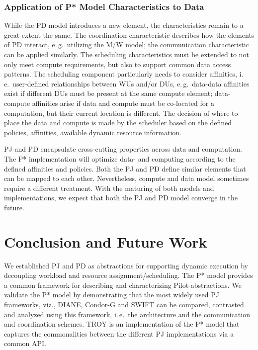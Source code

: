 \documentclass[conference,final]{IEEEtran}
\newcommand{\upp}{\vspace*{-0.5em}}
\begin{document}
\subsubsection*{Application of P* Model Characteristics to Data}

While the PD model introduces a new element, the characteristics remain
to a great extent the same. The coordination characteristic describes
how the elements of PD interact, e.\,g.\ utilizing the M/W model; the 
communication characteristic can be applied similarly. The scheduling 
characteristics must be extended to not only meet compute requirements, but also 
to support common data access patterns. The scheduling 
component particularly needs to consider affinities, i.\,e.\ user-defined 
relationships between WUs and/or DUs, e.\,g.\ data-data affinities exist if
different DUs must be present at the same compute element; data-compute
affinities arise if data and compute must be co-located for a
computation, but their current location is different. The decision of
where to place the data and compute is made by the scheduler based on
the defined policies, affinities, available dynamic resource
information.

PJ and PD encapsulate cross-cutting properties across data and
computation. The P* implementation will optimize data- and computing
according to the defined affinities and policies. Both the PJ and PD
define similar elements that can be mapped to each
other. Nevertheless, compute and data model sometimes require a
different treatment. With the maturing of both models and
implementations, we expect that both the PJ and PD model converge in
the future. 

%


\section{Conclusion and Future Work\upp\upp}


We established PJ and PD as abstractions for supporting dynamic
execution by decoupling workload and resource
assignment/scheduling. The P* model provides a common framework for
describing and characterizing Pilot-abstractions.  We validate the P*
model by demonstrating that the most widely used PJ frameworks,
viz., DIANE, Condor-G and SWIFT can be compared, contrasted and
analyzed using this framework, i.\,e.\ the architecture and the
communication and coordination schemes.  TROY is an implementation of
the P* model that captures the commonalities between the different PJ
implementations via a common API.
\end{document}
